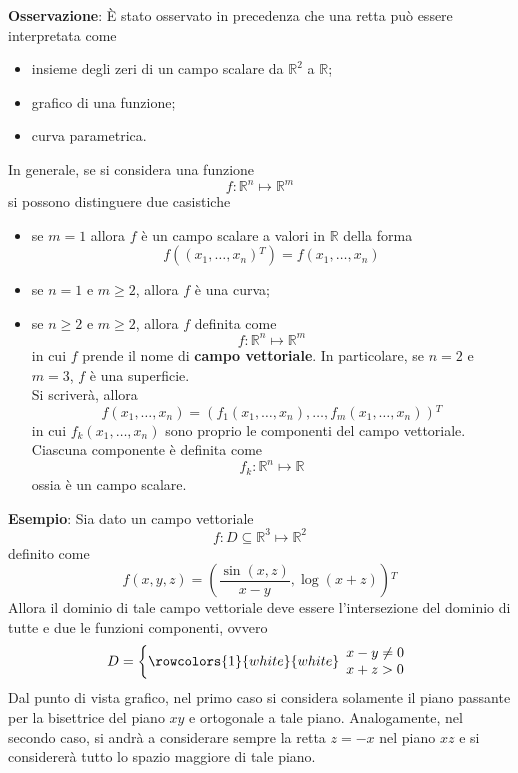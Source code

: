 \documentclass[a4paper]{extarticle}
\begin{document}
\vspace{2em}
\noindent
\textbf{Osservazione}: È stato osservato in precedenza che una retta può essere interpretata come
\begin{itemize}
    \item insieme degli zeri di un campo scalare da $\mathbb{R}^2$ a $\mathbb{R}$;
    \item grafico di una funzione;
    \item curva parametrica.
\end{itemize}
In generale, se si considera una funzione
\[f : \mathbb{R}^n \longmapsto \mathbb{R}^m\]
si possono distinguere due casistiche
\begin{itemize}
    \item se $m=1$ allora $f$ è un campo scalare a valori in $\mathbb{R}$ della forma
    \[f \left((x_1,\dots,x_n){^T}\right) = f(x_1,\dots,x_n)\]
    \item se $n=1$ e $m\geq 2$, allora $f$ è una curva;
    \item se $n\geq 2$ e $m\geq 2$, allora $f$ definita come
    \[f : \mathbb{R}^n \longmapsto \mathbb{R}^m\]
    in cui $f$ prende il nome di \textbf{campo vettoriale}. In particolare, se $n=2$ e $m=3$, $f$ è una superficie.\\
    Si scriverà, allora
    \[f(x_1,\dots,x_n) = \left(f_1(x_1,\dots,x_n),\dots,f_m(x_1,\dots,x_n) \right){^T}\]
    in cui $f_k(x_1,\dots,x_n)$ sono proprio le componenti del campo vettoriale. Ciascuna componente è definita come
    \[f_k : \mathbb{R}^n \longmapsto \mathbb{R}\]
    ossia è un campo scalare.
\end{itemize}

\vspace{1em}
\noindent
\textbf{Esempio}: Sia dato un campo vettoriale
\[f : D \subseteq \mathbb{R}^3 \longmapsto \mathbb{R}^2\]
definito come
\[f(x,y,z) = \left(\frac{\sin(x,z)}{x-y}, \log(x+z)\right){^T}\]
Allora il dominio di tale campo vettoriale deve essere l'intersezione del dominio di tutte e due le funzioni componenti, ovvero
\[
    D=\left\{
    \rowcolors{1}{white}{white}
    \begin{array}{l}
        x-y \neq 0\\
        x+z > 0
    \end{array}
    \right.
\]
Dal punto di vista grafico, nel primo caso si considera solamente il piano passante per la bisettrice del piano $xy$ e ortogonale a tale piano. Analogamente, nel secondo caso, si andrà a considerare sempre la retta $z=-x$ nel piano $xz$ e si considererà tutto lo spazio maggiore di tale piano.
\end{document}
